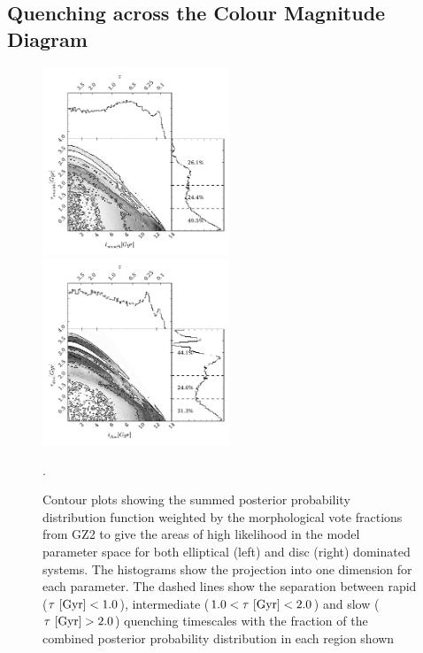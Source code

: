 \documentclass[useAMS,usenatbib]{mn2e}
\begin{document}
\subsection{Quenching across the Colour Magnitude Diagram}\label{gv}

\begin{figure}
\includegraphics[width=0.4975\textwidth]{red_smooth.pdf}
\includegraphics[width=0.4975\textwidth]{red_disc.pdf}
\caption{Contour plots showing the summed posterior probability distribution function weighted by the morphological vote fractions from GZ2 to give the areas of high likelihood in the model parameter space for both elliptical (left) and disc (right) dominated systems. The histograms show the projection into one dimension for each parameter. The dashed lines show the separation between rapid ($\tau ~\rm{[Gyr]} < 1.0$), intermediate ($1.0 < \tau ~\rm{[Gyr]} < 2.0$) and slow ($\tau ~\rm{[Gyr]} > 2.0$) quenching timescales with the fraction of the combined posterior probability distribution in each region shown}.
\label{red_s}
\end{figure}
\end{document}

